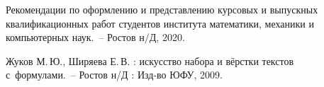 \documentclass[14pt]{mmcs_article}
\begin{document}
\newpage

\renewcommand{\refname}{\centering \textbf{Литература}}

\begin{thebibliography}{0}
  Рекомендации по оформлению
  и представлению курсовых
  и выпускных квалификационных работ
  студентов института математики,
  механики и компьютерных наук.~--
  Ростов н/Д, 2020.

  Жуков М.\,Ю., Ширяева Е.\,В.
  \LaTeXe: искусство набора и вёрстки текстов с~формулами.~-- Ростов н/Д : Изд-во ЮФУ, 2009.
\end{thebibliography}
\end{document}
